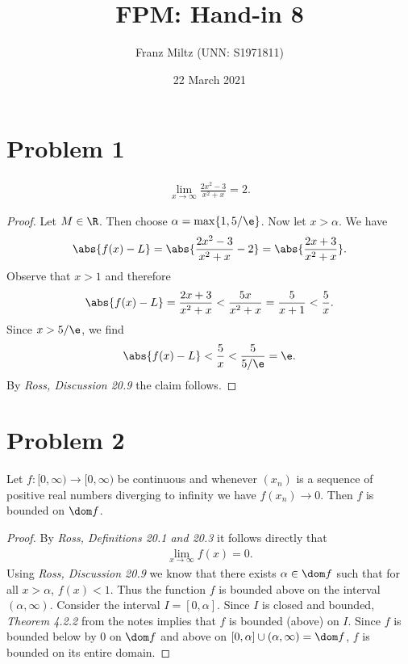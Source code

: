 \documentclass{article}
\begin{document}
\title{FPM: Hand-in 8}
\author{Franz Miltz (UNN: S1971811)}
\date{22 March 2021}
\maketitle
\mkthms
\section*{Problem 1}

\begin{claim*}
    \begin{align*}
        \lim_{x\to\infty} \frac{2x^2-3}{x^2+x}=2.
    \end{align*}
\end{claim*}

\begin{proof}
    Let $M\in\R$. Then choose $\alpha=\max\{1, 5/\e\}$. Now let $x>\alpha$.
    We have
    \begin{align*}
        \abs{f(x)-L} = \abs{\frac{2x^2-3}{x^2+x}-2} = \abs{\frac{2x+3}{x^2+x}}.
    \end{align*}
    Observe that $x>1$ and therefore
    \begin{align*}
        \abs{f(x)-L} = \frac{2x+3}{x^2+x}< \frac{5x}{x^2+x} = \frac{5}{x+1} < \frac{5}{x}.
    \end{align*}
    Since $x>5/\e$, we find
    \begin{align*}
        \abs{f(x)-L} < \frac{5}{x} < \frac{5}{5/\e} = \e.
    \end{align*}
    By \emph{Ross, Discussion 20.9} the claim follows.
\end{proof}

\section*{Problem 2}

\begin{claim*}
    Let $f:[0,\infty)\to[0,\infty)$ be continuous and whenever
    $(x_n)$ is a sequence of positive real numbers diverging to
    infinity we have $f(x_n)\to 0$. Then $f$ is bounded on $\dom f$.
\end{claim*}

\begin{proof}
    By \emph{Ross, Definitions 20.1 and 20.3} it follows directly that
    \begin{align*}
        \lim_{x\to \infty} f(x) = 0.
    \end{align*}
    Using \emph{Ross, Discussion 20.9} we know that there
    exists $\alpha\in \dom f$ such that for all $x>\alpha$, $f(x)<1$.
    Thus the function $f$ is bounded above on the interval
    $(\alpha, \infty)$. Consider the interval $I=[0,\alpha]$. Since $I$
    is closed and bounded, \emph{Theorem 4.2.2} from the notes implies
    that $f$ is bounded (above) on $I$. Since $f$ is bounded below by
    $0$ on $\dom f$ and above on $[0,\alpha]\cup(\alpha,\infty)=\dom f$,
    $f$ is bounded on its entire domain.
\end{proof}
\end{document}
